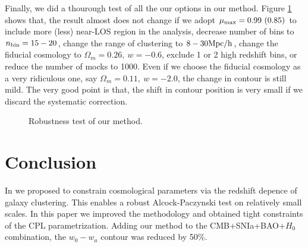 \documentclass[useAMS,usenatbib]{mnras}
\begin{document}
Finally, we did a thourough test of all the our options in our method.
Figure \ref{fig_contest} shows that,
the result almost does not change if 
we adopt $\mu_{\rm max}=0.99\ (0.85)$ to include more (less) near-LOS region in the analysis,
decrease number of bins to $n_{\rm bin}=15-20$,
change the range of clustering to $8-30 \rm Mpc/h$,
change the fiducial cosmology to $\Omega_m=0.26,\ w=-0.6$,
exclude 1 or 2 high redshift bins,
or reduce the number of mocks to 1000.
Even if we choose the fiducial cosmology as a very ridiculous one,
say $\Omega_m=0.11,\ w=-2.0$, the change in contour is still mild.
The very good point is that, 
the shift in contour position is very small if we discard the systematic correction.


\begin{figure}
   \caption{\label{fig_contest}
   Robustness test of our method.
   }
\end{figure}

\section{Conclusion}

In \cite{Li2016} we proposed to constrain cosmological parameters via the redshift depence of galaxy clustering.
This enables a robust Alcock-Paczynski test on relatively small scales.
In this paper we improved the methodology and obtained tight constraints of the CPL parametrization.
Adding our method to the CMB+SNIa+BAO+$H_0$ combination, the $w_0-w_a$ contour was reduced by 50\%.
\end{document}
